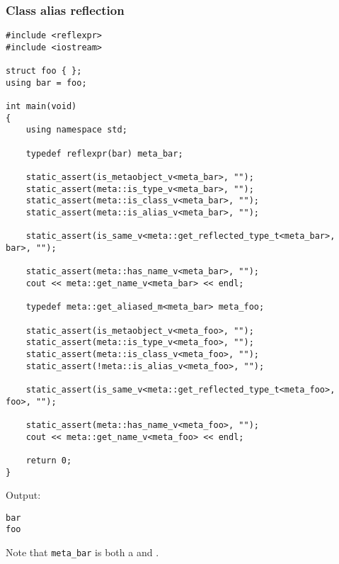 \subsubsection{Class alias reflection}

\begin{verbatim}
#include <reflexpr>
#include <iostream>

struct foo { };
using bar = foo;

int main(void)
{
	using namespace std;

	typedef reflexpr(bar) meta_bar;

	static_assert(is_metaobject_v<meta_bar>, "");
	static_assert(meta::is_type_v<meta_bar>, "");
	static_assert(meta::is_class_v<meta_bar>, "");
	static_assert(meta::is_alias_v<meta_bar>, "");

	static_assert(is_same_v<meta::get_reflected_type_t<meta_bar>, bar>, "");

	static_assert(meta::has_name_v<meta_bar>, "");
	cout << meta::get_name_v<meta_bar> << endl;

	typedef meta::get_aliased_m<meta_bar> meta_foo;

	static_assert(is_metaobject_v<meta_foo>, "");
	static_assert(meta::is_type_v<meta_foo>, "");
	static_assert(meta::is_class_v<meta_foo>, "");
	static_assert(!meta::is_alias_v<meta_foo>, "");

	static_assert(is_same_v<meta::get_reflected_type_t<meta_foo>, foo>, "");

	static_assert(meta::has_name_v<meta_foo>, "");
	cout << meta::get_name_v<meta_foo> << endl;

	return 0;
}
\end{verbatim}

Output:

\begin{verbatim}
bar
foo
\end{verbatim}

Note that \texttt{meta\_bar} is both a  and .

